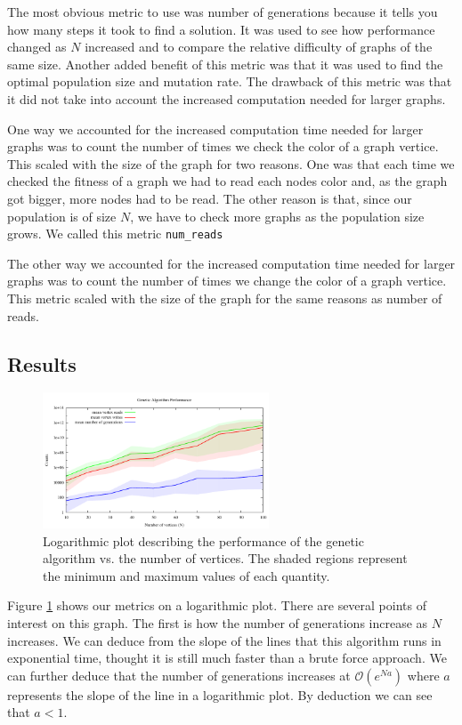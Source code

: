 \documentclass{article}
\begin{document}
	The most obvious metric to use was number of generations because it tells you how many steps it took to find a solution. It was used to see how performance changed as $N$ increased and to compare the relative difficulty of graphs of the same size. Another added benefit of this metric was that it was used to find the optimal population size and mutation rate. The drawback of this metric was that it did not take into account the increased computation needed for larger graphs.
	
	One way we accounted for the increased computation time needed for larger graphs was to count the number of times we check the color of a graph vertice. This scaled with the size of the graph for two reasons. One was that each time we checked the fitness of a graph we had to read each nodes color and, as the graph got bigger, more nodes had to be read. The other reason is that, since our population is of size $N$, we have to check more graphs as the population size grows. We called this metric \texttt{num\_reads}
	
	The other way we accounted for the increased computation time needed for larger graphs was to count the number of times we change the color of a graph vertice. This metric scaled with the size of the graph for the same reasons as number of reads.
	
	\subsection{Results}
	\begin{figure}[h!]
		\centering
		\includegraphics[width=0.6\textwidth]{../results_5/genetic/genetic_performance}
		\caption{Logarithmic plot describing the performance of the genetic algorithm vs. the number of vertices. The shaded regions represent the minimum and maximum values of each quantity.}
		\label{genetic_Performance}
	\end{figure}
	
	Figure \ref{genetic_Performance} shows our metrics on a logarithmic plot. There are several points of interest on this graph. The first is how the number of generations increase as $N$ increases. We can deduce from the slope of the lines that this algorithm runs in exponential time, thought it is still much faster than a brute force approach. We can further deduce that the number of generations increases at $\mathcal{O} (e^{Na})$ where $a$ represents the slope of the line in a logarithmic plot. By deduction we can see that  $a<1$.
	
\end{document}
